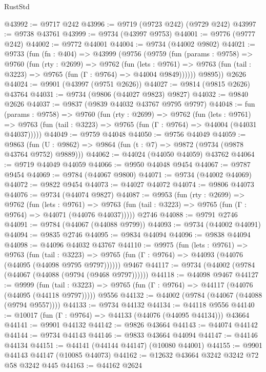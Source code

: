 \begin{lexlean}{RustStd}
\begin{coremodule}
@43992 := @9717 @242
@43996 := @9719 (@9723 @242) (@9729 @242)
@43997 := @9738 @43761
@43999 := @9734 (@43997 @9753)
@44001 := @9776 (@9777 @242)
@44002 := @9772 @44001
@44004 := @9734 (@44002 @9802)
@44021 := @9733
    (fun (fn : @404) =>
    @43999
      (@9756
        (@9759
          (fun (params : @9758) =>
          @9760
            (fun (rty : @2699) =>
            @9762
              (fun (lets : @9761) =>
              @9763 (fun (tail : @3223) => @9765 (fun (Γ : @9764) => @44004 @9849))))))
        @9895))
    @2626
@44024 := @9901 (@43997 (@9751 @2626))
@44027 := @9814 (@9815 @2626) @43764
@44031 := @9734 (@9806 (@44027 @9823) @9827)
@44032 := @9840 @2626
@44037 := @9837 (@9839 @44032 @43767 @9795 @9797)
@44048 := fun (params : @9758) =>
  @9760
    (fun (rty : @2699) =>
    @9762
      (fun (lets : @9761) =>
      @9763 (fun (tail : @3223) => @9765 (fun (Γ : @9764) => @44004 (@44031 @44037)))))
@44049 := @9759 @44048
@44050 := @9756 @44049
@44059 := @9863
    (fun (U : @9862) => @9864 (fun (t : @7) => @9872 (@9734 (@9878 @43764 @9752) @9889)))
@44062 := @44024 (@44050 @44059) @43762
@44064 := @9719 @44049 @44059
@44066 := @9950 @44048 @9454
@44067 := @9787 @9454
@44069 := @9784 (@44067 @9800)
@44071 := @9734 (@44002 @44069)
@44072 := @9822 @9454
@44073 := @44027 @44072
@44074 := @9806 @44073
@44076 := @9734 (@44074 @9827)
@44087 := @9953
    (fun (rty : @2699) =>
    @9762
      (fun (lets : @9761) =>
      @9763 (fun (tail : @3223) => @9765 (fun (Γ : @9764) => @44071 (@44076 @44037)))))
    @2746
@44088 := @9791 @2746
@44091 := @9784 (@44067 (@44088 @9799))
@44093 := @9734 (@44002 @44091)
@44094 := @9835 @2746
@44095 := @9834 @44094
@44096 := @9838 @44094
@44098 := @44096 @44032 @43767
@44110 := @9975
    (fun (lets : @9761) =>
    @9763
      (fun (tail : @3223) =>
      @9765 (fun (Γ : @9764) => @44093 (@44076 (@44095 (@44098 @9795 @9797))))))
    @9467
@44117 := @9734 (@44002 (@9784 (@44067 (@44088 (@9794 (@9468 @9797))))))
@44118 := @44098 @9467
@44127 := @9999
    (fun (tail : @3223) => @9765 (fun (Γ : @9764) => @44117 (@44076 (@44095 (@44118 @9797)))))
    @9556
@44132 := @44002 (@9784 (@44067 (@44088 (@9794 @9557))))
@44133 := @9734 @44132
@44134 := @44118 @9556
@44140 := @10017 (fun (Γ : @9764) => @44133 (@44076 (@44095 @44134))) @43664
@44141 := @9901 @44132
@44142 := @9826 @43664
@44143 := @44074 @44142
@44144 := @9734 @44143
@44146 := @9833 @43664 @44094
@44147 := @44146 @44134
@44151 := @44141 (@44144 @44147) (@10080 @44001)
@44155 := @9901 @44143 @44147 (@10085 @44073)
@44162 := @12632 @43664 @3242 @3242 @72 @58 @3242 @445
@44163 := @44162 @2624

\end{coremodule}
\end{lexlean}
